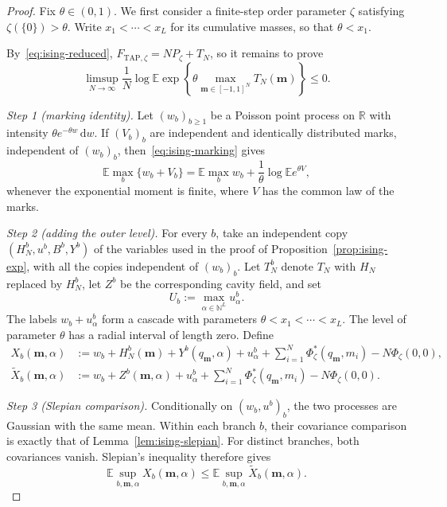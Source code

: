 \documentclass[a4paper,10pt,reqno]{amsart}
\numberwithin{equation}{section}
\newcommand{\dR}{\mathbb{R}}%
\newcommand{\dN}{\mathbb{N}}%
\newcommand{\dE}{\mathbb{E}}%
\newcommand{\dd}{\mathrm{d}}
\newcommand{\TAP}{\mathrm{TAP}}
\newcommand{\bfm}{\mathbf{m}}
\begin{document}
	\begin{proof}
		Fix $\theta\in(0,1)$. We first consider a finite-step order
		parameter $\zeta$ satisfying $\zeta(\{0\})>\theta$. Write
		$x_1<\cdots<x_L$ for its cumulative masses, so that
		$\theta<x_1$.
		
		By~\eqref{eq:ising-reduced},
		$F_{\TAP,\zeta}=NP_\zeta+T_N$, so it remains to prove
		\begin{equation}\label{eq:ising-tilt-reduced}
			\limsup_{N\to\infty}
			\frac1N
			\log\dE\exp\left\{
			\theta\max_{\bfm\in[-1,1]^N}T_N(\bfm)
			\right\}
			\le0.
		\end{equation}
		
		\medskip\noindent\emph{Step 1 (marking identity).}\;
		Let $(w_b)_{b\ge1}$ be a Poisson point process on $\dR$ with
		intensity $\theta e^{-\theta w}\,\dd w$. If $(V_b)_b$ are
		independent and identically distributed marks, independent of
		$(w_b)_b$, then~\eqref{eq:ising-marking} gives
		\begin{equation}\label{eq:outer-theta-marking}
			\dE\max_b\{w_b+V_b\}
			=
			\dE\max_b w_b
			+\frac1\theta\log\dE e^{\theta V},
		\end{equation}
		whenever the exponential moment is finite, where $V$ has the
		common law of the marks.
		
		\medskip\noindent\emph{Step 2 (adding the outer level).}\;
		For every $b$, take an independent copy
		$(H_N^b,u^b,B^b,Y^b)$ of the variables used in the proof of
		Proposition~\ref{prop:ising-exp}, with all the copies independent
		of $(w_b)_b$. Let $T_N^b$ denote $T_N$ with $H_N$ replaced by
		$H_N^b$, let $Z^b$ be the corresponding cavity field, and set
		\[
		U_b:=\max_{\alpha\in\dN^L}u_\alpha^b.
		\]
		The labels $w_b+u_\alpha^b$ form a cascade with parameters
		$\theta<x_1<\cdots<x_L$. The level of parameter $\theta$ has a
		radial interval of length zero. Define
		\[
		\begin{aligned}
			X_b(\bfm,\alpha)
			&:=
			w_b+H_N^b(\bfm)+Y^b(q_\bfm,\alpha)+u_\alpha^b
			+\sum_{i=1}^N\Phi_\zeta^*(q_\bfm,m_i)
			-N\Phi_\zeta(0,0),\\
			\widetilde X_b(\bfm,\alpha)
			&:=
			w_b+Z^b(\bfm,\alpha)+u_\alpha^b
			+\sum_{i=1}^N\Phi_\zeta^*(q_\bfm,m_i)
			-N\Phi_\zeta(0,0).
		\end{aligned}
		\]
		
		\medskip\noindent\emph{Step 3 (Slepian comparison).}\;
		Conditionally on $(w_b,u^b)_b$, the two processes are Gaussian with
		the same mean. Within each branch
		$b$, their covariance comparison is exactly that of
		Lemma~\ref{lem:ising-slepian}. For distinct branches, both
		covariances vanish. Slepian's inequality therefore gives
		\[
		\dE\sup_{b,\bfm,\alpha}X_b(\bfm,\alpha)
		\le
		\dE\sup_{b,\bfm,\alpha}\widetilde X_b(\bfm,\alpha).
		\]
		

\end{proof}
\end{document}
